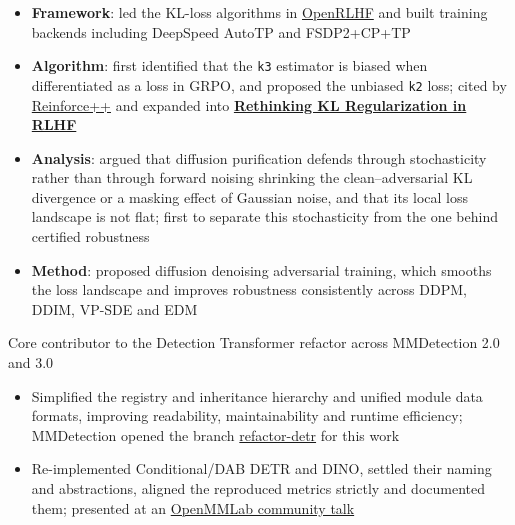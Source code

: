 \documentclass{resume}
\begin{document}
\begin{itemize}
  \item \textbf{Framework}: led the KL-loss algorithms in \href{https://github.com/OpenRLHF/OpenRLHF}{OpenRLHF} and built training backends including DeepSpeed AutoTP and FSDP2+CP+TP
  \item \textbf{Algorithm}: first identified that the \texttt{k3} estimator is biased when differentiated as a loss in GRPO, and proposed the unbiased \texttt{k2} loss; cited by \href{https://arxiv.org/abs/2501.03262}{Reinforce++} and expanded into \href{https://arxiv.org/abs/2510.01555}{\textbf{Rethinking KL Regularization in RLHF}}
\end{itemize}

\begin{itemize}
  \item \textbf{Analysis}: argued that diffusion purification defends through stochasticity rather than through forward noising shrinking the clean--adversarial KL divergence or a masking effect of Gaussian noise, and that its local loss landscape is not flat; first to separate this stochasticity from the one behind certified robustness
  \item \textbf{Method}: proposed diffusion denoising adversarial training, which smooths the loss landscape and improves robustness consistently across DDPM, DDIM, VP-SDE and EDM
\end{itemize}

Core contributor to the Detection Transformer refactor across MMDetection 2.0 and 3.0
\begin{itemize}
  \item Simplified the registry and inheritance hierarchy and unified module data formats, improving readability, maintainability and runtime efficiency; MMDetection opened the branch \href{https://github.com/open-mmlab/mmdetection/tree/refactor-detr}{refactor-detr} for this work
  \item Re-implemented Conditional/DAB DETR and DINO, settled their naming and abstractions, aligned the reproduced metrics strictly and documented them; presented at an \href{https://www.bilibili.com/video/BV17x4y1w7ZK/?spm_id_from=333.337.search-card.all.click}{OpenMMLab community talk}
\end{itemize}
\end{document}
